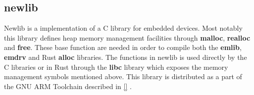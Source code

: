 \subsection{newlib}

Newlib is a implementation of a C library for embedded devices.
Most notably this library defines heap memory management facilities through \textbf{malloc}, \textbf{realloc} and \textbf{free}.
These base function are needed in order to compile both the \textbf{emlib}, \textbf{emdrv} and Rust \textbf{alloc} libraries.
The functions in newlib is used directly by the C libraries or in Rust through the \textbf{libc} library which exposes the memory management symbols mentioned above.
This library is distributed as a part of the GNU ARM Toolchain described in \autoref{} .
